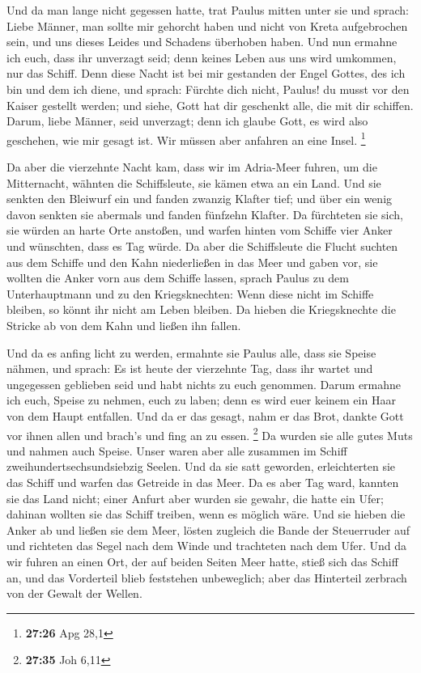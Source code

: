  Und da man lange nicht gegessen hatte, trat Paulus mitten
unter sie und sprach: Liebe Männer, man sollte mir gehorcht haben und
nicht von Kreta aufgebrochen sein, und uns dieses Leides und Schadens
überhoben haben.  Und nun ermahne ich euch, dass ihr
unverzagt seid; denn keines Leben aus uns wird umkommen, nur das Schiff.
 Denn diese Nacht ist bei mir gestanden der Engel Gottes,
des ich bin und dem ich diene,  und sprach: Fürchte dich
nicht, Paulus! du musst vor den Kaiser gestellt werden; und siehe, Gott
hat dir geschenkt alle, die mit dir schiffen.  Darum, liebe
Männer, seid unverzagt; denn ich glaube Gott, es wird also geschehen,
wie mir gesagt ist.  Wir müssen aber anfahren an eine
Insel. \footnote{\textbf{27:26} Apg 28,1}

 Da aber die vierzehnte Nacht kam, dass wir im Adria-Meer
fuhren, um die Mitternacht, wähnten die Schiffsleute, sie kämen etwa an
ein Land.  Und sie senkten den Bleiwurf ein und fanden
zwanzig Klafter tief; und über ein wenig davon senkten sie abermals und
fanden fünfzehn Klafter.  Da fürchteten sie sich, sie
würden an harte Orte anstoßen, und warfen hinten vom Schiffe vier Anker
und wünschten, dass es Tag würde.  Da aber die Schiffsleute
die Flucht suchten aus dem Schiffe und den Kahn niederließen in das Meer
und gaben vor, sie wollten die Anker vorn aus dem Schiffe lassen,
 sprach Paulus zu dem Unterhauptmann und zu den
Kriegsknechten: Wenn diese nicht im Schiffe bleiben, so könnt ihr nicht
am Leben bleiben.  Da hieben die Kriegsknechte die Stricke
ab von dem Kahn und ließen ihn fallen.

 Und da es anfing licht zu werden, ermahnte sie Paulus
alle, dass sie Speise nähmen, und sprach: Es ist heute der vierzehnte
Tag, dass ihr wartet und ungegessen geblieben seid und habt nichts zu
euch genommen.  Darum ermahne ich euch, Speise zu nehmen,
euch zu laben; denn es wird euer keinem ein Haar von dem Haupt
entfallen.  Und da er das gesagt, nahm er das Brot, dankte
Gott vor ihnen allen und brach's und fing an zu essen. \footnote{\textbf{27:35}
  Joh 6,11}  Da wurden sie alle gutes Muts und nahmen auch
Speise.  Unser waren aber alle zusammen im Schiff
zweihundertsechsundsiebzig Seelen.  Und da sie satt
geworden, erleichterten sie das Schiff und warfen das Getreide in das
Meer.  Da es aber Tag ward, kannten sie das Land nicht;
einer Anfurt aber wurden sie gewahr, die hatte ein Ufer; dahinan wollten
sie das Schiff treiben, wenn es möglich wäre.  Und sie
hieben die Anker ab und ließen sie dem Meer, lösten zugleich die Bande
der Steuerruder auf und richteten das Segel nach dem Winde und
trachteten nach dem Ufer.  Und da wir fuhren an einen Ort,
der auf beiden Seiten Meer hatte, stieß sich das Schiff an, und das
Vorderteil blieb feststehen unbeweglich; aber das Hinterteil zerbrach
von der Gewalt der Wellen.

